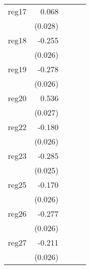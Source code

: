 {\begin{longtable}{l*{4}{D{.}{.}{-1}}}
\addlinespace
reg17       &       0.068\sym{*}  &                     &                     &                     \\
            &     (0.028)         &                     &                     &                     \\
\addlinespace
reg18       &      -0.255\sym{***}&                     &                     &                     \\
            &     (0.026)         &                     &                     &                     \\
\addlinespace
reg19       &      -0.278\sym{***}&                     &                     &                     \\
            &     (0.026)         &                     &                     &                     \\
\addlinespace
reg20       &       0.536\sym{***}&                     &                     &                     \\
            &     (0.027)         &                     &                     &                     \\
\addlinespace
reg22       &      -0.180\sym{***}&                     &                     &                     \\
            &     (0.026)         &                     &                     &                     \\
\addlinespace
reg23       &      -0.285\sym{***}&                     &                     &                     \\
            &     (0.025)         &                     &                     &                     \\
\addlinespace
reg25       &      -0.170\sym{***}&                     &                     &                     \\
            &     (0.026)         &                     &                     &                     \\
\addlinespace
reg26       &      -0.277\sym{***}&                     &                     &                     \\
            &     (0.026)         &                     &                     &                     \\
\addlinespace
reg27       &      -0.211\sym{***}&                     &                     &                     \\
            &     (0.026)         &                     &                     &                     \\

\end{longtable}}
